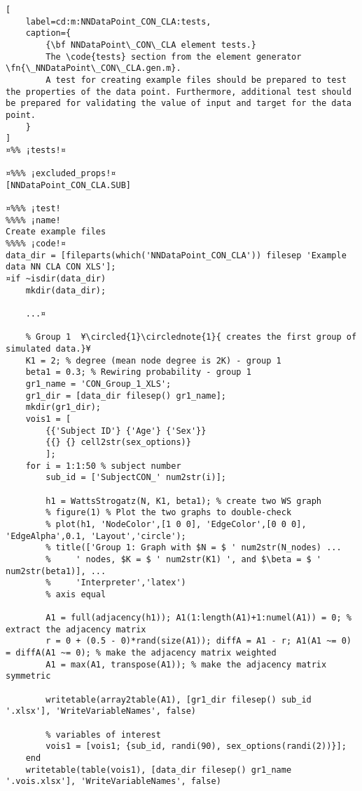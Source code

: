 \documentclass{tufte-handout}
\begin{document}
\clearpage

\begin{lstlisting}[
	label=cd:m:NNDataPoint_CON_CLA:tests,
	caption={
		{\bf NNDataPoint\_CON\_CLA element tests.}
		The \code{tests} section from the element generator \fn{\_NNDataPoint\_CON\_CLA.gen.m}.
		A test for creating example files should be prepared to test the properties of the data point. Furthermore, additional test should be prepared for validating the value of input and target for the data point.
	}
]			
¤%% ¡tests!¤

¤%%% ¡excluded_props!¤
[NNDataPoint_CON_CLA.SUB]

¤%%% ¡test!
%%%% ¡name!
Create example files
%%%% ¡code!¤
data_dir = [fileparts(which('NNDataPoint_CON_CLA')) filesep 'Example data NN CLA CON XLS'];
¤if ~isdir(data_dir)
    mkdir(data_dir);

    ...¤

    % Group 1  ¥\circled{1}\circlednote{1}{ creates the first group of simulated data.}¥
    K1 = 2; % degree (mean node degree is 2K) - group 1
    beta1 = 0.3; % Rewiring probability - group 1
    gr1_name = 'CON_Group_1_XLS';
    gr1_dir = [data_dir filesep() gr1_name];
    mkdir(gr1_dir);
    vois1 = [
        {{'Subject ID'} {'Age'} {'Sex'}}
        {{} {} cell2str(sex_options)}
        ];
    for i = 1:1:50 % subject number
        sub_id = ['SubjectCON_' num2str(i)];

        h1 = WattsStrogatz(N, K1, beta1); % create two WS graph
        % figure(1) % Plot the two graphs to double-check
        % plot(h1, 'NodeColor',[1 0 0], 'EdgeColor',[0 0 0], 'EdgeAlpha',0.1, 'Layout','circle');
        % title(['Group 1: Graph with $N = $ ' num2str(N_nodes) ...
        %     ' nodes, $K = $ ' num2str(K1) ', and $\beta = $ ' num2str(beta1)], ...
        %     'Interpreter','latex')
        % axis equal

        A1 = full(adjacency(h1)); A1(1:length(A1)+1:numel(A1)) = 0; % extract the adjacency matrix
        r = 0 + (0.5 - 0)*rand(size(A1)); diffA = A1 - r; A1(A1 ~= 0) = diffA(A1 ~= 0); % make the adjacency matrix weighted
        A1 = max(A1, transpose(A1)); % make the adjacency matrix symmetric

        writetable(array2table(A1), [gr1_dir filesep() sub_id '.xlsx'], 'WriteVariableNames', false)

        % variables of interest
        vois1 = [vois1; {sub_id, randi(90), sex_options(randi(2))}];
    end
    writetable(table(vois1), [data_dir filesep() gr1_name '.vois.xlsx'], 'WriteVariableNames', false)


\end{lstlisting}
\end{document}
